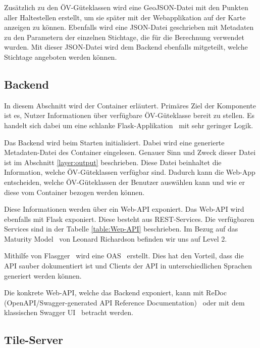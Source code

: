 Zusätzlich zu den \acs{ÖV}-Güteklassen wird eine GeoJSON-Datei mit den Punkten aller Haltestellen erstellt, um sie später mit der Webapplikation auf der Karte anzeigen zu können.
Ebenfalls wird eine JSON-Datei geschrieben mit Metadaten zu den Parametern der einzelnen Stichtage, die für die Berechnung verwendet wurden.
Mit dieser JSON-Datei wird dem Backend ebenfalls mitgeteilt, welche Stichtage angeboten werden können.

\subsection{Backend}
\label{Implementation:Backend}

In diesem Abschnitt wird der Container  erläutert.
Primäres Ziel der Komponente ist es, Nutzer Informationen über verfügbare \acs{ÖV}-Güteklasse bereit zu stellen.
Es handelt sich dabei um eine schlanke Flask-Applikation~\cite{flask} mit sehr geringer Logik.

Das Backend wird beim Starten initialisiert.
Dabei wird eine generierte Metadaten-Datei des Container  eingelesen.
Genauer Sinn und Zweck dieser Datei ist im Abschnitt \ref{layer:output} beschrieben.
Diese Datei beinhaltet die Information, welche \acs{ÖV}-Güteklassen verfügbar sind.
Dadurch kann die Web-App entscheiden, welche \acs{ÖV}-Güteklassen der Benutzer auswählen kann und wie er diese vom Container  bezogen werden können.

Diese Informationen werden über ein Web-\ac{API} exponiert.
Das Web-\ac{API} wird ebenfalls mit Flask exponiert.
Diese besteht aus \acl{REST}-Services.
Die verfügbaren Services sind in der Tabelle \ref{table:Wep-API} beschrieben.
Im Bezug auf das Maturity Model~\cite{maturity_model} von Leonard Richardson befinden wir uns auf Level 2.

Mithilfe von Flasgger~\cite{flasgger} wird eine \ac{OAS}~\cite{open-api-specificaiton} erstellt.
Dies hat den Vorteil, dass die \ac{API} sauber dokumentiert ist und Clients der \ac{API} in unterschiedlichen Sprachen generiert werden können.

Die konkrete Web-\ac{API}, welche das Backend exponiert, kann mit ReDoc (OpenAPI/Swagger-generated API Reference Documentation)~\cite{oevgk18-backend-api-spec} oder mit dem klassischen Swagger UI~\cite{oevgk18-backend-api-swaggerui} betracht werden.

\subsection{Tile-Server}
\label{Implementation:Tile-Server}

